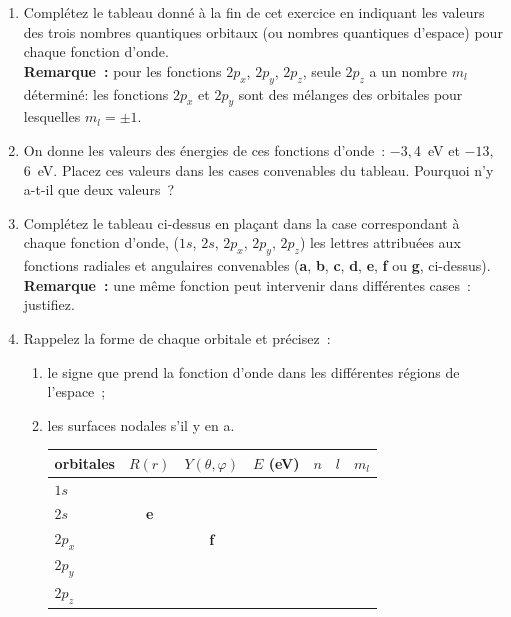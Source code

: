 \begin{enumerate}[\bf 1)]
\item Compl\'etez le tableau donné à la fin de cet exercice
        en indiquant les valeurs des trois nombres quantiques orbitaux (ou nombres quantiques d'espace) pour chaque fonction d'onde.\\

\textbf{Remarque~:} pour les fonctions $2p_x$, $2p_y$, $2p_z$, seule $2p_z$ a un nombre $m_l$ déterminé: les fonctions $2p_x$ et $2p_y$ sont des mélanges des orbitales pour lesquelles $m_l=\pm 1$.
\item On donne les valeurs des \'energies de ces fonctions d'onde~: $-3,$4~eV et $-13,$6~eV. Placez ces valeurs dans les cases convenables du tableau. Pourquoi n'y a-t-il que deux valeurs~?

\item Compl\'etez le tableau ci-dessus en pla\c{c}ant dans la case correspondant \`a chaque fonction d'onde, ($1s$, $2s$, $2p_x$, $2p_y$, $2p_z$) les lettres attribu\'ees aux fonctions radiales et angulaires convenables (\textbf{a}, \textbf{b}, \textbf{c}, \textbf{d}, \textbf{e}, \textbf{f} ou \textbf{g}, ci-dessus).\\

\textbf{Remarque~:} une m\^eme fonction peut intervenir dans diff\'erentes cases~: justifiez.
\item Rappelez la forme de chaque orbitale et précisez~:
\begin{enumerate}
\item le signe que prend la fonction d'onde dans les diff\'erentes r\'egions de l'espace~;
\item les surfaces nodales s'il y en a.
\begin{center}
\begin{tabular}{|l|c|c|c|c|c| c|}\hline
orbitales & $R(r)$ & $Y(\theta,\varphi)$ & $E$ (eV) & $n$ & $l$ &  $m_l$\\\hline
$1s$   &           &                     & & & &\\\hline
$2s$   & \textbf{e}&                     & & & &\\\hline
$2p_x$ &           & \textbf{f}          & & & &\cellcolor{gray} \\\hline
$2p_y$ &           &                     & & & &\cellcolor{gray}\\\hline
$2p_z$ &           &                     & & & &\\\hline
\end{tabular}
\end{center}

\end{enumerate}
\end{enumerate}

